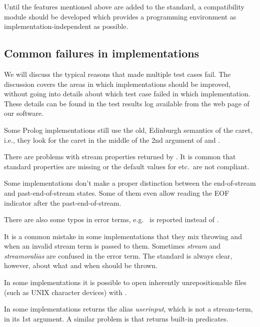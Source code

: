 \documentclass[draft]{llncs}%
\begin{document}
Until the features mentioned above are added to the standard, a
compatibility module should be developed which provides a programming
environment as implementation-independent as possible.


\subsection{Common failures in implementations}

We will discuss the typical reasons that made multiple test cases fail. The
discussion covers the areas in which implementations should be
improved, without going into details
about which test case failed in which implementation. These details can be
found in the test results log available
from the web page of our software.

Some Prolog implementations still use the old, Edinburgh semantics of the
caret, i.e., they look for the caret in the middle of the 2nd argument of
 and .

There are problems with stream properties returned by
.
It is common that standard properties are
missing or the default values for  etc.\ are not
compliant.

Some implementations don't make a proper distinction between the
end-of-stream and past-end-of-stream states. Some of them even
allow reading the EOF indicator after the past-end-of-stream.

There are also some typos in error terms, e.g.\
 is reported instead of
\texttx{type\textunderscore error(atomic,...)}.

It is a common mistake in some implementations that they mix throwing
\hbox{\errorname{existence\textunderscore error}} and
 when an
invalid stream term is passed to them. Sometimes \textsl{stream} and
\textsl{stream\textunderscore or\textunderscore alias} are confused in the
error term.
The standard is always clear, however, about what and when should be thrown.

In some implementations it is possible to open 
inherently unrepositionable files
(such as UNIX character devices) with .

In some implementations  returns
the alias
\textsl{user\textunderscore input}, which is not a stream-term, in
its 1st argument. A similar problem is that
\hbox{} returns built-in predicates.
\end{document}
